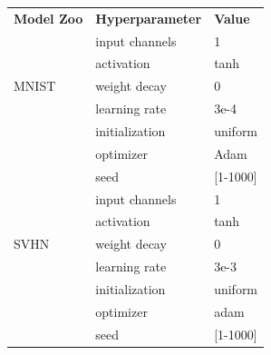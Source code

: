 \begin{table}[ht!]
\begin{minipage}{0.58\textwidth}
{\begin{tabularx}{\linewidth}{lll}
        \toprule
        \textbf{Model Zoo}     & \textbf{Hyperparameter} & \textbf{Value}   \\
        \cmidrule(r){1-1} \cmidrule(rl){2-2}  \cmidrule(rl){3-3}
        \multirow{5}{*}{MNIST} & input channels          & 1                \\
                               & activation              & tanh             \\
                               & weight decay                      & 0                \\
                               & learning rate                      & 3e-4             \\
                               & initialization          & uniform          \\
                               & optimizer               & Adam             \\
                               & seed                    & [1-1000]         \\
        \cmidrule(r){1-1} \cmidrule(rl){2-2}  \cmidrule(rl){3-3}%
        \multirow{5}{*}{SVHN}  & input channels          & 1                \\
                               & activation              & tanh             \\
                               & weight decay                      & 0                \\
                               & learning rate                      & 3e-3             \\
                               & initialization          & uniform          \\
                               & optimizer               & adam             \\
                               & seed                    & [1-1000]         \\
        \cmidrule(r){1-1} \cmidrule(rl){2-2}  \cmidrule(rl){3-3}%

\end{tabularx}}
\end{minipage}
\end{table}
